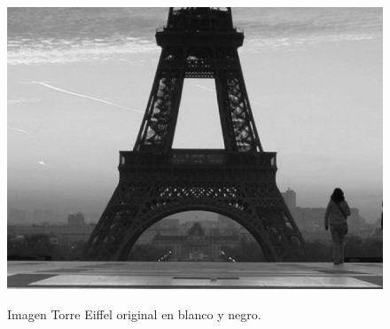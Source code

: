\begin{figure}[ht!]
\begin{center}
\includegraphics[height=0.4\textwidth]{fig/eiffel_grayscale}\\
\caption{Imagen Torre Eiffel original en blanco y negro.}
\label{fig_eiffel_grayscale}
\end{center}
\end{figure}
